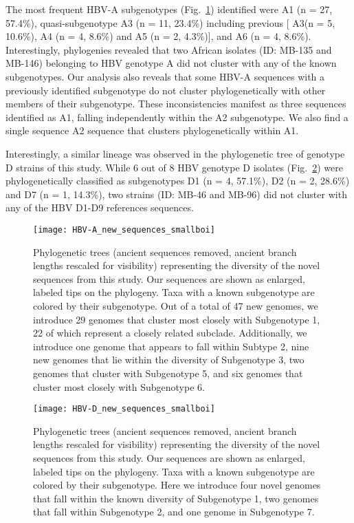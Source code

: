 The most frequent HBV-A subgenotypes (Fig.~\ref{fig:HBV-A_new_sequences}) identified were A1 (n = 27, 57.4\%), quasi-subgenotype A3 (n = 11, 23.4\%) including previous [ A3(n = 5, 10.6\%), A4 (n = 4, 8.6\%) and A5 (n = 2, 4.3\%)], and A6 (n = 4, 8.6\%).
Interestingly, phylogenies revealed that two African isolates (ID: MB-135 and MB-146) belonging to HBV genotype A did not cluster with any of the known subgenotypes.
Our analysis also reveals that some HBV-A sequences with a previously identified subgenotype do not cluster phylogenetically with other members of their subgenotype.
These inconsistencies manifest as three sequences identified as A1, falling independently within the A2 subgenotype.
We also find a single sequence A2 sequence that clusters phylogenetically within A1.

Interestingly, a similar lineage was observed in the phylogenetic tree of genotype D strains of this study.
While 6 out of 8 HBV genotype D isolates (Fig.~\ref{fig:HBV-D_new_sequences}) were phylogenetically classified as subgenotypes D1 (n = 4, 57.1\%), D2 (n = 2, 28.6\%) and D7 (n = 1, 14.3\%), two strains (ID: MB-46 and MB-96) did not cluster with any of the HBV D1-D9 references sequences.


\begin{figure}[ht]
  \centering
  \medskip
  \texttt{[image: HBV-A\_new\_sequences\_smallboi]}
  \caption[HBV-A New sequences]{Phylogenetic trees (ancient sequences removed, ancient branch lengths rescaled for visibility) representing the diversity of the novel sequences from this study. Our sequences are shown as enlarged, labeled tips on the phylogeny. Taxa with a known subgenotype are colored by their subgenotype. Out of a total of 47 new genomes, we introduce 29 genomes that cluster most closely with Subgenotype 1, 22 of which represent a closely related subclade. Additionally, we introduce one genome that appears to fall within Subtype 2, nine new genomes that lie within the diversity of Subgenotype 3, two genomes that cluster with Subgenotype 5, and six genomes that cluster most closely with Subgenotype 6.}
  \label{fig:HBV-A_new_sequences}
\end{figure}

\begin{figure}[ht]
  \centering
  \medskip
  \texttt{[image: HBV-D\_new\_sequences\_smallboi]}
  \caption[HBV-D New sequences]{Phylogenetic trees (ancient sequences removed, ancient branch lengths rescaled for visibility) representing the diversity of the novel sequences from this study. Our sequences are shown as enlarged, labeled tips on the phylogeny. Taxa with a known subgenotype are colored by their subgenotype. Here we introduce four novel genomes that fall within the known diversity of Subgenotype 1, two genomes that fall within Subgenotype 2, and one genome in Subgenotype 7.}
  \label{fig:HBV-D_new_sequences}
\end{figure}

